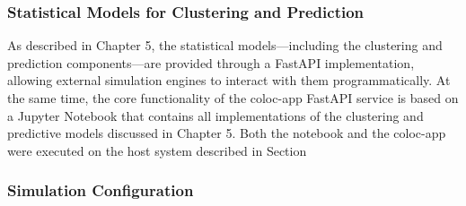 


\subsubsection{Statistical Models for Clustering and Prediction}
\label{sec:evaluation_statistical_learning_methods}
As described in Chapter 5, the statistical models—including the clustering and prediction components—are provided through a FastAPI implementation, allowing external simulation engines to interact with them programmatically. At the same time, the core functionality of the coloc-app FastAPI service is based on a Jupyter Notebook that contains all implementations of the clustering and predictive models discussed in Chapter 5. Both the notebook and the coloc-app were executed on the host system described in Section %

\subsubsection{Simulation Configuration}
\label{sec:evaluation_simulation_configuration}

